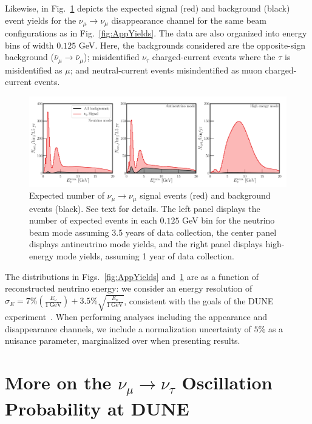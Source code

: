 \documentclass[aps,prd,onecolumn,nofootinbib,superscriptaddress, 11pt]{revtex4}
\begin{document}
Likewise, in Fig.~\ref{fig:DisYields} depicts the expected signal (red) and background (black) event yields for the $\nu_\mu \to \nu_\mu$ disappearance channel for the same beam configurations as in Fig.~\ref{fig:AppYields}. The data are also organized into energy bins of width $0.125$ GeV. Here, the backgrounds considered are the opposite-sign background ($\bar{\nu}_\mu \to \bar{\nu}_\mu$); misidentified $\nu_\tau$ charged-current events where the $\tau$ is misidentified as $\mu$; and neutral-current events misindentified as muon charged-current events.
\begin{figure}[ht]
\begin{center}
\includegraphics[width=\textwidth]{DisEventYields_Stack.pdf}
\caption{Expected number of $\nu_\mu \to \nu_\mu$ signal events (red) and background events (black). See text for details. The left panel displays the number of expected events in each $0.125$ GeV bin for the neutrino beam mode assuming 3.5 years of data collection, the center panel displays antineutrino mode yields, and the right panel displays high-energy mode yields, assuming 1 year of data collection.}\label{fig:DisYields}
\end{center}
\end{figure}


The distributions in Figs.~\ref{fig:AppYields} and~\ref{fig:DisYields} are as a function of reconstructed neutrino energy: we consider an energy resolution of $\sigma_E = 7\% \left(\frac{E_\nu}{1\ \mathrm{GeV}}\right) + 3.5\%\sqrt{\frac{E_\nu}{1\ \mathrm{GeV}}}$, consistent with the goals of the DUNE experiment~\cite{Acciarri:2015uup}. When performing analyses including the appearance and disappearance channels, we include a normalization uncertainty of $5\%$ as a nuisance parameter, marginalized over when presenting results.


\section{More on the $\nu_{\mu}\to\nu_{\tau}$ Oscillation Probability at DUNE}
\label{appendix:prob}
\end{document}
